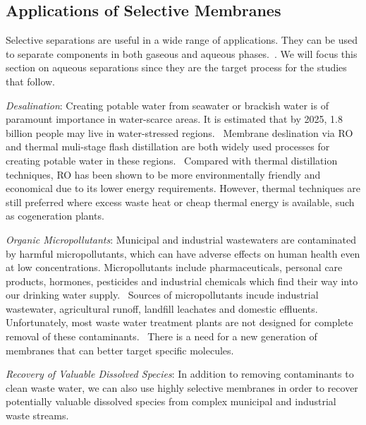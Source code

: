   \subsection{Applications of Selective Membranes}
  
  Selective separations are useful in a wide range of applications. They can be used
  to separate components in both gaseous and aqueous phases.~\cite{baker_gas_2014}. We 
  will focus this section on aqueous separations since they are the target process
  for the studies that follow.
  
  \textit{Desalination}: Creating potable water from seawater or brackish water is of 
  paramount importance in water-scarce areas. It is estimated that by 2025, 1.8 
  billion people may live in water-stressed regions.~\cite{navarro-ortega_managing_2015} %
  Membrane deslination via RO and thermal muli-stage flash distillation are 
  both widely used processes for creating potable water in these regions.~\cite{fritzmann_state---art_2007}
  Compared with thermal distillation techniques, RO has been shown to 
  be more environmentally friendly and economical due to its lower energy
  requirements.\cite{morton_environmental_1997} However, thermal techniques are still
  preferred where excess waste heat or cheap thermal energy is available, such as
  cogeneration plants.\cite{bhojwani_technology_2019}

  \textit{Organic Micropollutants}: Municipal and industrial wastewaters are contaminated
  by harmful micropollutants, which can have adverse effects on human health even at low 
  concentrations.\cite{schwarzenbach_challenge_2006} Micropollutants include pharmaceuticals,
  personal care products, hormones, pesticides and industrial chemicals which find their way
  into our drinking water supply.~\cite{barbosa_occurrence_2016} Sources of micropollutants
  incude industrial wastewater, agricultural runoff, landfill leachates and domestic 
  effluents.~\cite{mompelat_occurrence_2009} Unfortunately, most waste water treatment 
  plants are not designed for complete removal of these contaminants.~\cite{tijani_review_2013}
  There is a need for a new generation of membranes that can better target specific molecules.
  
  \textit{Recovery of Valuable Dissolved Species}: In addition to removing contaminants 
  to clean waste water, we can also use highly selective membranes in order to recover
  potentially valuable dissolved species from complex municipal and industrial waste
  streams.~\cite{guest_new_2009,daigger_evolving_2009}
  
